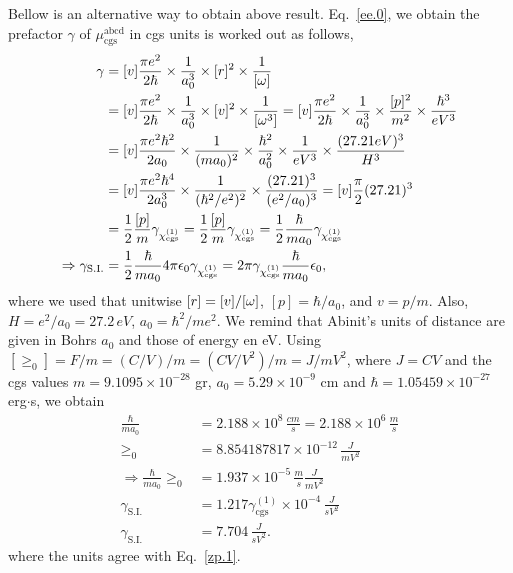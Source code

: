 \documentclass[12pt]{article}
\numberwithin{equation}{section}
\begin{document}
\begin{enumerate}
Bellow is an alternative way to obtain above result.
Eq.~\eqref{ee.0}, we obtain the prefactor $\gamma$ of  
$\mu^{\mathrm{abcd}}_{\mathrm{cgs}}$ in  
 cgs  units is worked out as follows, 
\begin{align}\label{e.4d}
\gamma&=[v]
\frac{\pi e^2}{2\hbar}\times\frac{1}{a^3_0}\times[r]^2\times\frac{1}{[\omega]}
\nonumber\\
&=[v]
\frac{\pi e^2}{2\hbar}\times\frac{1}{a^3_0}\times[v]^2\times\frac{1}{[\omega^3]}
=[v]
\frac{\pi e^2}{2\hbar}\times\frac{1}{a^3_0}\times\frac{[p]^2}{m^2}
\times\frac{\hbar^3}{eV^3}
\nonumber\\
&=[v]
\frac{\pi e^2\hbar^2}{2a_0}\times\frac{1}{(ma_0)^2}\times\frac{\hbar^2}{a^2_0}
\times\frac{1}{eV^3}\times \frac{(27.21eV)^3}{H^3}
\nonumber\\
&=[v]
\frac{\pi e^2\hbar^4}{2a^3_0}\times\frac{1}{(\hbar^2/e^2)^2}
\times \frac{(27.21)^3}{(e^2/a_0)^3}
=[v]
\frac{\pi}{2}(27.21)^3 
\nonumber\\
&=
\frac{1}{2}\frac{[p]}{m}\gamma_{\chi^{(1)}_{\mathrm{cgs}}} 
=\frac{1}{2}\frac{[p]}{m}\gamma_{\chi^{(1)}_{\mathrm{cgs}}} 
=\frac{1}{2}
\frac{\hbar}{ma_0}
\gamma_{\chi^{(1)}_{\mathrm{cgs}}} 
\nonumber\\
\Rightarrow 
\gamma_{\mathrm{S.I.}} &=
\frac{1}{2}\frac{\hbar}{ma_0}
 4\pi\epsilon_0\gamma_{\chi^{(1)}_{\mathrm{cgs}}} 
=2\pi\gamma_{\chi^{(1)}_{\mathrm{cgs}}}  \frac{\hbar}{ma_0}
\epsilon_0 
,
\end{align}  
where we used that unitwise $[r]=[v]/[\omega]$, $[p]=\hbar/a_0$, and $v=p/m$.
Also, $H=e^2/a_0=27.2\,eV$, $a_0=\hbar^2/me^2$. We remind that Abinit\Reg's 
units of distance are given in Bohrs $a_0$ and those of energy en eV.
Using 
$[\ge_0]=F/m=(C/V)/m=(CV/V^2)/m=J/mV^2$, where $J=CV$
and the 
cgs values $m=9.1095\times 10^{-28}$ gr,
$a_0=5.29\times 10^{-9}$ cm  
and $\hbar=1.05459\times 10^{-27}$ erg$\cdot$s, we obtain  
\begin{align}\label{e.5}
\frac{\hbar}{ma_0}
&=2.188\times 10^{8}\,\frac{cm}{s}
=2.188\times 10^{6}\,\frac{m}{s}
\nonumber\\
\ge_0&=8.854187817\times 10^{-12}\,\frac{J}{mV^2}
\nonumber\\
\Rightarrow  
\frac{\hbar}{ma_0}
\ge_0&=1.937\times 10^{-5}\,\frac{m}{s}\frac{J}{mV^2}
\nonumber\\
\gamma_{\mathrm{S.I.}} &= 
1.217 
\gamma^{(1)}_{\mathrm{cgs}}\times 10^{-4} \,\frac{J}{sV^2}
\nonumber\\
\gamma_{\mathrm{S.I.}} &= 
7.704\,\frac{J}{sV^2}
.  
\end{align} 
where the units agree with Eq.~\eqref{zp.1}. 


\end{enumerate}
\end{document}
